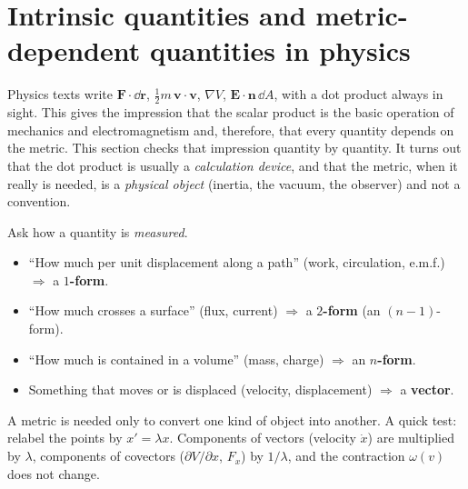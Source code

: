 \section{Intrinsic quantities and metric-dependent quantities in physics}\label{sec:phys}

Physics texts write $\mathbf F\cdot\dd\mathbf r$, $\frac12m\,\mathbf v\cdot\mathbf v$, $\nabla V$, $\mathbf E\cdot\mathbf n\,\dd A$, with a dot product always in sight. This gives the impression that the scalar product is the
basic operation of mechanics and electromagnetism and, therefore, that every quantity depends on the metric. This section checks that impression quantity by quantity. It turns out that the dot product is usually a \emph{calculation device}, and that
the metric, when it really is needed, is a \emph{physical object} (inertia, the vacuum, the observer) and not a convention.

\begin{keyidea}
Ask how a quantity is \emph{measured}.
\begin{itemize}
\item ``How much per unit displacement along a path'' (work, circulation, e.m.f.) $\Rightarrow$ a \textbf{$1$-form}.
\item ``How much crosses a surface'' (flux, current) $\Rightarrow$ a \textbf{$2$-form} (an $(n{-}1)$-form).
\item ``How much is contained in a volume'' (mass, charge) $\Rightarrow$ an \textbf{$n$-form}.
\item Something that moves or is displaced (velocity, displacement) $\Rightarrow$ a \textbf{vector}.
\end{itemize}
A metric is needed only to convert one kind of object into another. A quick test: relabel the points by $x'=\lambda x$. Components of vectors (velocity $\dot x$) are multiplied by $\lambda$, components of covectors ($\partial V/\partial x$, $F_x$) by $1/\lambda$, and the contraction $\omega(v)$ does not change.
\end{keyidea}




